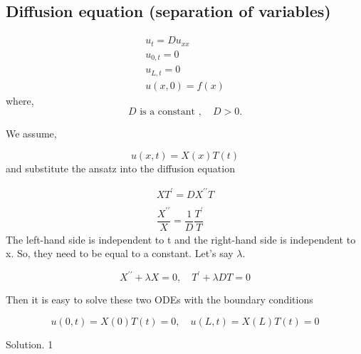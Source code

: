 \documentclass[a4]{article}
\begin{document}
\subsection{Diffusion equation (separation of variables)}
\begin{equation}\begin{array}{c}
u_{t}=D u_{x x}\\
u_{0,t} = 0\\
u_{L,t} = 0\\
u(x, 0)=f(x)
\end{array}\end{equation}
where,
\begin{equation}
D \text{  is a constant },\quad D>0.
\end{equation}\par
We assume,\par 
\begin{equation}u(x, t)=X(x) T(t)\end{equation}
and substitute the ansatz into the diffusion equation\par
\begin{equation}\begin{array}{c}X T^{\prime}=D X^{\prime \prime} T\\
\quad\\
\dfrac{X^{\prime \prime}}{X}=\dfrac{1}{D} \dfrac{T^{\prime}}{T}

\end{array}\end{equation} 
The left-hand side is independent to t and the right-hand side is independent to x. So, they need to be equal to a constant. Let's say $\lambda$.\par
\begin{equation}X^{\prime \prime}+\lambda X=0, \quad T^{\prime}+\lambda D T=0\end{equation}\par 
\noindent Then it is easy to solve these two ODEs with the boundary conditions\par 
\begin{equation}u(0, t)=X(0) T(t)=0, \quad u(L, t)=X(L) T(t)=0\end{equation}\par 
Solution. 1\par 
\end{document}
